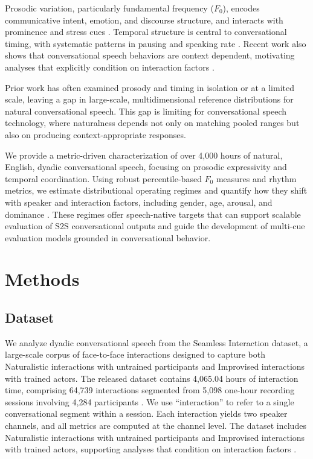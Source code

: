 \documentclass[conference]{IEEEtran}
\begin{document}
Prosodic variation, particularly fundamental frequency ($F_0$), encodes communicative intent, emotion, and discourse structure, and interacts with prominence and stress cues \cite{banziger_role_2005, pell_emotional_2011, xu_speech_2005, sluijter_acoustic_1996, sluijter_spectral_1996}. 
Temporal structure is central to conversational timing, with systematic patterns in pausing and speaking rate \cite{goldman1958speech, pellegrino_automatic_2004, pellegrino_across-language_2011, jiao_estimating_2015, morgan_combining_1998, nanjo_language_2004}. 
Recent work also shows that conversational speech behaviors are context dependent, motivating analyses that explicitly condition on interaction factors \cite{wynn_conversational_2024}.

Prior work has often examined prosody and timing in isolation or at a limited scale, leaving a gap in large-scale, multidimensional reference distributions for natural conversational speech. 
This gap is limiting for conversational speech technology, where naturalness depends not only on matching pooled ranges but also on producing context-appropriate responses.

We provide a metric-driven characterization of over 4{,}000 hours of natural, English, dyadic conversational speech, focusing on prosodic expressivity and temporal coordination. 
Using robust percentile-based $F_0$ measures and rhythm metrics, we estimate distributional operating regimes and quantify how they shift with speaker and interaction factors, including gender, age, arousal, and dominance \cite{wynn_conversational_2024, traunmuller_acoustic_2000}. 
These regimes offer speech-native targets that can support scalable evaluation of S2S conversational outputs and guide the development of multi-cue evaluation models grounded in conversational behavior.

\section{Methods}

\subsection{Dataset}
We analyze dyadic conversational speech from the Seamless Interaction dataset, a large-scale corpus of face-to-face interactions designed to capture both Naturalistic interactions with untrained participants and Improvised interactions with trained actors. 
The released dataset contains 4,065.04 hours of interaction time, comprising 64,739 interactions segmented from 5,098 one-hour recording sessions involving 4,284 participants \cite{seamless_interaction}. 
We use ``interaction'' to refer to a single conversational segment within a session. 
Each interaction yields two speaker channels, and all metrics are computed at the channel level. 
The dataset includes Naturalistic interactions with untrained participants and Improvised interactions with trained actors, supporting analyses that condition on interaction factors \cite{fusaroli_dialog_2014, wynn_conversational_2024}.
\end{document}
